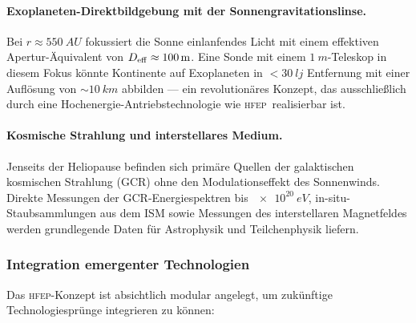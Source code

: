 ﻿\documentclass[a4paper,12pt,twoside]{article}
\theoremstyle{plain}
\theoremstyle{definition}
\theoremstyle{remark}
\newcommand{\HFEP}{\textsc{hfep}}
\begin{document}
	\paragraph{Exoplaneten-Direktbildgebung mit der Sonnengravitationslinse.}
	Bei $r \approx \SI{550}{AU}$ fokussiert die Sonne einlanfendes
	Licht mit einem effektiven Apertur-Äquivalent von
	$D_{\rm eff} \approx \SI{100}{m}$. Eine Sonde mit einem
	$\SI{1}{m}$-Teleskop in diesem Fokus könnte Kontinente auf Exoplaneten
	in $<\SI{30}{lj}$ Entfernung mit einer Auflösung von $\sim\SI{10}{km}$
	abbilden --- ein revolutionäres Konzept, das ausschließlich durch
	eine Hochenergie-Antriebstechnologie wie \HFEP\ realisierbar ist.

	\paragraph{Kosmische Strahlung und interstellares Medium.}
	Jenseits der Heliopause befinden sich primäre Quellen der galaktischen
	kosmischen Strahlung (GCR) ohne den Modulationseffekt des Sonnenwinds.
	Direkte Messungen der GCR-Energiespektren bis $\SI{e20}{eV}$,
	in-situ-Staubsammlungen aus dem ISM sowie Messungen des interstellaren
	Magnetfeldes werden grundlegende Daten für Astrophysik und Teilchenphysik
	liefern.

	\subsubsection{Integration emergenter Technologien}

	Das \HFEP-Konzept ist absichtlich modular angelegt, um zukünftige
	Technologiesprünge integrieren zu können:
\end{document}

